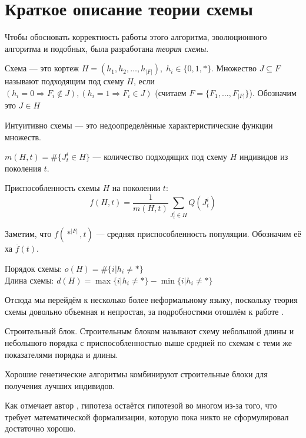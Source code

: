 \section*{Краткое описание теории схемы}
Чтобы обосновать корректность работы этого алгоритма, эволюционного алгоритма и подобных, была разработана \textit{теория схемы}.

\begin{definition}
    Схема --- это кортеж $H = (h_1, h_2, \ldots, h_{|F|}), \;h_i \in \{0, 1, *\}$. Множество $J \subseteq F$ называют подходящим под схему $H$, если $(h_i = 0 \Rightarrow F_i \notin J), (h_i = 1 \Rightarrow F_i \in J)$ (считаем $F = \{F_1, \ldots, F_{|F|}\}$). Обозначим это $J \in H$
\end{definition}
Интуитивно схемы --- это недоопределённые характеристические функции множеств.
\begin{definition}
    $m(H, t) = \#\{J_t^i \in H\}$ --- количество подходящих под схему $H$ индивидов из поколения $t$.
\end{definition}
\begin{definition}
    Приспособленность схемы $H$ на поколении $t$: $$f(H, t) = \frac{1}{m(H, t)}\sum_{J_t^i \in H}Q(J_t^i)$$
\end{definition}
Заметим, что $f(*^{|F|}, t)$ --- средняя приспособленность популяции. Обозначим её ха $\overline{f}(t)$.
\begin{definition}
    Порядок схемы: $o(H) = \#\{i|h_i \neq *\}$\\
    Длина схемы: $d(H) = \max\{i|h_i \neq *\} - \min\{i|h_i \neq *\}$
\end{definition}

Отсюда мы перейдём к несколько более неформальному языку, поскольку теория схемы довольно объемная и непростая, за подробностями отошлём к работе \cite{White14}.

\begin{definition}
    Строительный блок. Строительным блоком называют схему небольшой длины и небольшого порядка с приспособленностью выше средней по схемам с теми же показателями порядка и длины.
\end{definition}

\begin{hypothesis}
    Хорошие генетические алгоритмы комбинируют строительные блоки для получения лучших индивидов.
\end{hypothesis}

\begin{remark}
    Как отмечает автор \cite{White14}, гипотеза остаётся гипотезой во многом из-за того, что требует математической формализации, которую пока никто не сформулировал достаточно хорошо.
\end{remark}

